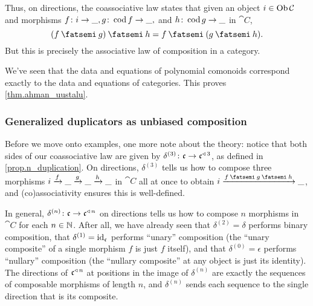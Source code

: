 \documentclass[Book-Poly]{subfiles}
\begin{document}
Thus, on directions, the coassociative law states that given an object $i\in\operatorname{Ob}\mathcal{C}$ and morphisms $f\colon i\to\_, g\colon\operatorname{cod} f\to\_,$ and $h\colon\operatorname{cod} g\to\_$ in $\cat C$,
\[
    (f\then g)\then h = f\then(g\then h).
\]
But this is precisely the associative law of composition in a category.

We've seen that the data and equations of polynomial comonoids correspond exactly to the data and equations of categories.
This proves \cref{thm.ahman_uustalu}.

\subsubsection{Generalized duplicators as unbiased composition}

Before we move onto examples, one more note about the theory: notice that both sides of our coassociative law are given by $\delta^{(3)}\colon\mathfrak{c}\to\mathfrak{c}^{\mathbin{\triangleleft}\,3}$, as defined in \cref{prop.n_duplication}.
On directions, $\delta^{(3)}$ tells us how to compose three morphisms $i\xrightarrow{f}\_\xrightarrow{g}\_\xrightarrow{h}\_$ in $\cat{C}$ all at once to obtain $i\To{f\:\then\:g\:\then\:h}\_$, and (co)associativity ensures this is well-defined.

In general, $\delta^{(n)}\colon\mathfrak{c}\to\mathfrak{c}^{\mathbin{\triangleleft}\,n}$ on directions tells us how to compose $n$ morphisms in $\cat{C}$ for each $n\in\mathbb{N}$.
After all, we have already seen that $\delta^{(2)}=\delta$ performs binary composition, that $\delta^{(1)}=\mathrm{id}_{\mathfrak{c}}$ performs ``unary'' composition (the ``unary composite'' of a single morphism $f$ is just $f$ itself), and that $\delta^{(0)}=\epsilon$ performs ``nullary'' composition (the ``nullary composite'' at any object is just its identity).
The directions of $\mathfrak{c}^{\mathbin{\triangleleft}\,n}$ at positions in the image of $\delta^{(n)}$ are exactly the sequences of composable morphisms of length $n$, and $\delta^{(n)}$ sends each sequence to the single direction that is its composite.

\end{document}
